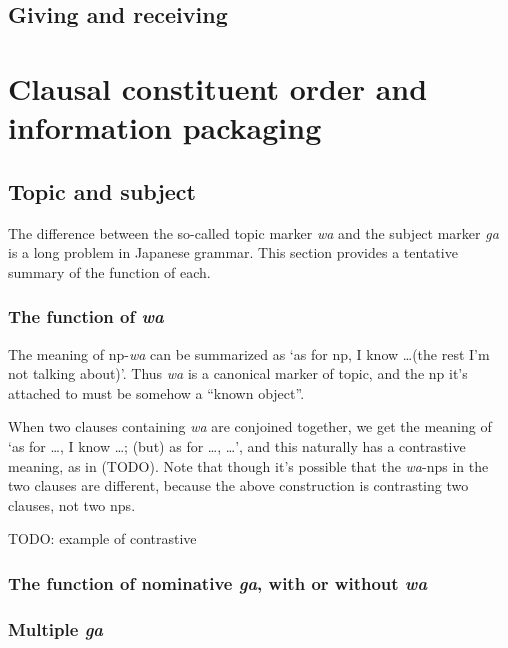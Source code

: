 \documentclass[UTF8, a4paper, oneside, scheme=plain]{ctexrep}
\newcommand{\corpus}[1]{\emph{#1}}
\newcommand{\translate}[1]{`#1'}
\begin{document}
\section{Giving and receiving}\label{sec:giving-and-receiving}

\chapter{Clausal constituent order and information packaging}

\section{Topic and subject}\label{sec:topic-subject}

The difference between the so-called topic marker \corpus{wa} and the subject marker \corpus{ga}
is a long problem in Japanese grammar.
This section provides a tentative summary of the function of each.

\subsection{The function of \corpus{wa}}\label{sec:wa-topic}

The meaning of \ac{np}-\corpus{wa} can be summarized as 
\translate{as for \ac{np}, I know \dots (the rest I'm not talking about)}.
Thus \corpus{wa} is a canonical marker of topic,
and the \ac{np} it's attached to must be somehow a ``known object''.

When two clauses containing \corpus{wa} are conjoined together,
we get the meaning of 
\translate{as for \dots, I know \dots; (but) as for \dots, \dots},
and this naturally has a contrastive meaning, as in (TODO).
Note that though it's possible that the \corpus{wa}-\ac{np}s in the two clauses are different,
because the above construction is contrasting two clauses, not two \ac{np}s.

\begin{exe}
    \ex TODO: example of contrastive  
\end{exe}

\subsection{The function of nominative \corpus{ga}, with or without \corpus{wa}} 

\subsection{Multiple \corpus{ga}}\label{sec:multiple-ga}
\end{document}
